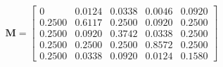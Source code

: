 \documentclass{report}
\begin{document}
\begin{equation*}
\mathbf{M} = \left[ 
\begin{array}{ccccc}
0 & 0.0124 & 0.0338 & 0.0046 & 0.0920 \\ 
0.2500 & 0.6117 & 0.2500 & 0.0920 & 0.2500 \\ 
0.2500 & 0.0920 & 0.3742 & 0.0338 & 0.2500 \\ 
0.2500 & 0.2500 & 0.2500 & 0.8572 & 0.2500 \\ 
0.2500 & 0.0338 & 0.0920 & 0.0124 & 0.1580
\end{array} \right]
\end{equation*}\\

\end{document}
